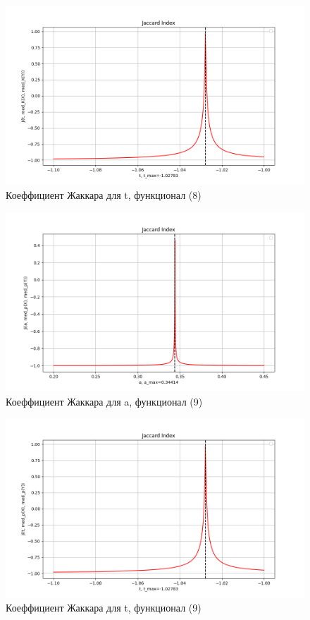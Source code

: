 \documentclass[a4paper,12pt]{article}
\begin{document}
\newpage
\begin{figure}[h!]
    \centering
    \includegraphics[width=0.9\linewidth]{Jaccard-t-med_K.png}
    \caption{Коеффициент Жаккара для t, функционал (8)}
\end{figure}

\begin{figure}[h!]
    \centering
    \includegraphics[width=0.9\linewidth]{Jaccard-a-med_p.png}
    \caption{Коеффициент Жаккара для a, функционал (9)}
\end{figure}

\newpage
\begin{figure}[h!]
    \centering
    \includegraphics[width=0.9\linewidth]{Jaccard-t-med_p.png}
    \caption{Коеффициент Жаккара для t, функционал (9)}
\end{figure}
\end{document}
